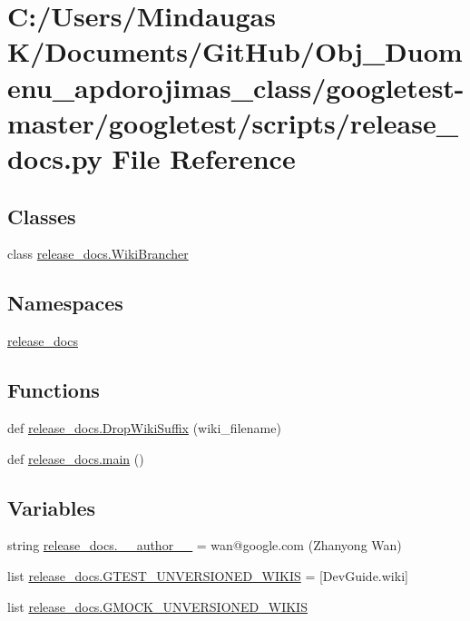 \hypertarget{googletest-master_2googletest_2scripts_2release__docs_8py}{}\section{C\+:/\+Users/\+Mindaugas K/\+Documents/\+Git\+Hub/\+Obj\+\_\+\+Duomenu\+\_\+apdorojimas\+\_\+class/googletest-\/master/googletest/scripts/release\+\_\+docs.py File Reference}
\label{googletest-master_2googletest_2scripts_2release__docs_8py}
\subsection*{Classes}
\begin{DoxyCompactItemize}
\item 
class \mbox{\hyperlink{classrelease__docs_1_1_wiki_brancher}{release\+\_\+docs.\+Wiki\+Brancher}}
\end{DoxyCompactItemize}
\subsection*{Namespaces}
\begin{DoxyCompactItemize}
\item 
 \mbox{\hyperlink{namespacerelease__docs}{release\+\_\+docs}}
\end{DoxyCompactItemize}
\subsection*{Functions}
\begin{DoxyCompactItemize}
\item 
def \mbox{\hyperlink{namespacerelease__docs_a6ea19a5ee397ce9f0565b90943d50e7f}{release\+\_\+docs.\+Drop\+Wiki\+Suffix}} (wiki\+\_\+filename)
\item 
def \mbox{\hyperlink{namespacerelease__docs_ac4eb92814ebe701e3936d1bfdd2ecf73}{release\+\_\+docs.\+main}} ()
\end{DoxyCompactItemize}
\subsection*{Variables}
\begin{DoxyCompactItemize}
\item 
string \mbox{\hyperlink{namespacerelease__docs_a552c656ae88e89e818b44f18fa40967b}{release\+\_\+docs.\+\_\+\+\_\+author\+\_\+\+\_\+}} = \textquotesingle{}wan@google.\+com (Zhanyong Wan)\textquotesingle{}
\item 
list \mbox{\hyperlink{namespacerelease__docs_aaeabb8c74d9db7a4b2f3c66e8f1a04ee}{release\+\_\+docs.\+G\+T\+E\+S\+T\+\_\+\+U\+N\+V\+E\+R\+S\+I\+O\+N\+E\+D\+\_\+\+W\+I\+K\+IS}} = \mbox{[}\textquotesingle{}Dev\+Guide.\+wiki\textquotesingle{}\mbox{]}
\item 
list \mbox{\hyperlink{namespacerelease__docs_a675f92ba4643a6aef7773a6178e49b29}{release\+\_\+docs.\+G\+M\+O\+C\+K\+\_\+\+U\+N\+V\+E\+R\+S\+I\+O\+N\+E\+D\+\_\+\+W\+I\+K\+IS}}
\end{DoxyCompactItemize}
